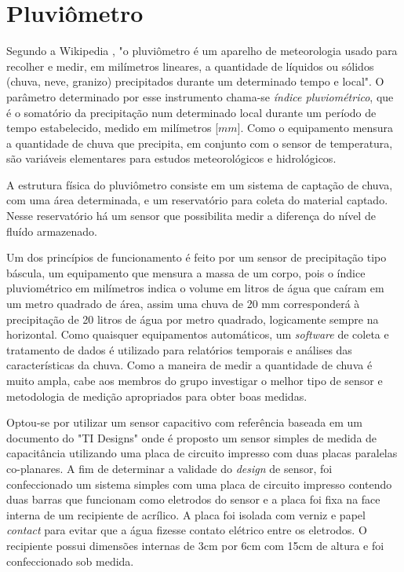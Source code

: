 \documentclass[a4paper]{instrumentacao}
\begin{document}
\section{Pluviômetro}
Segundo a Wikipedia \cite{pluviometro}, "o pluviômetro é um aparelho de meteorologia usado para recolher e medir, em milímetros lineares, a quantidade de líquidos ou sólidos (chuva, neve, granizo) precipitados durante um determinado tempo e local". O parâmetro determinado por esse instrumento chama-se \textit{índice pluviométrico}, que é o somatório da precipitação num determinado local durante um período de tempo estabelecido, medido em milímetros [$mm$]. Como o equipamento mensura a quantidade de chuva que precipita, em conjunto com o sensor de temperatura, são variáveis elementares para estudos meteorológicos e hidrológicos.

A estrutura física do pluviômetro consiste em um sistema de captação de chuva, com uma área determinada, e um reservatório para coleta do material captado. Nesse reservatório há um sensor que possibilita medir a diferença do nível de fluído armazenado.

Um dos princípios de funcionamento é feito por um sensor de precipitação tipo báscula, um equipamento que mensura a massa de um corpo, pois o índice pluviométrico em milímetros indica o volume em litros de água que caíram em um metro quadrado de área, assim uma chuva de 20 mm corresponderá à precipitação de 20 litros de água por metro quadrado, logicamente sempre na horizontal. Como quaisquer equipamentos automáticos, um \textit{software} de coleta e tratamento de dados é utilizado para relatórios temporais e análises das características da chuva. Como a maneira de medir a quantidade de chuva é muito ampla, cabe aos membros do grupo investigar o melhor tipo de sensor e metodologia de medição apropriados para obter boas medidas. 

Optou-se por utilizar um sensor capacitivo com referência baseada em um documento do "TI Designs"\cite{pluviometro-capacitivo-texas} onde é proposto um sensor simples de medida de capacitância utilizando uma placa de circuito impresso com duas placas paralelas co-planares. A fim de determinar a validade do \textit{design} de sensor, foi confeccionado um sistema simples com uma placa de circuito impresso contendo duas barras que funcionam como eletrodos do sensor e a placa foi fixa na face interna de um recipiente de acrílico. A placa foi isolada com verniz e papel \textit{contact} para evitar que a água fizesse contato elétrico entre os eletrodos. O recipiente possui dimensões internas de 3cm por 6cm com 15cm de altura e foi confeccionado sob medida.
\end{document}
